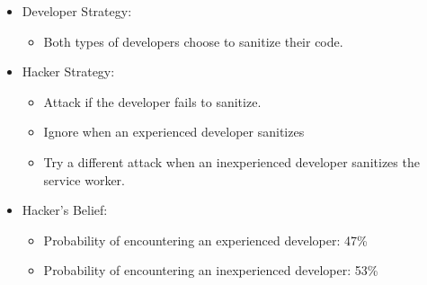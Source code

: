 \documentclass[letterpaper,12pt]{report}
\begin{document}
\begin{itemize}
    \item Developer Strategy:
    \begin{itemize}
        \item Both types of developers choose to sanitize their code.
    \end{itemize}
    \item Hacker Strategy:
    \begin{itemize}
        \item Attack if the developer fails to sanitize.
        \item Ignore when an experienced developer sanitizes
        \item Try a different attack when an inexperienced developer sanitizes the service worker.
    \end{itemize}
    \item Hacker's Belief:
    \begin{itemize}
        \item Probability of encountering an experienced developer: 47\%
        \item Probability of encountering an inexperienced developer: 53\%
    \end{itemize}
\end{itemize}
\end{document}
